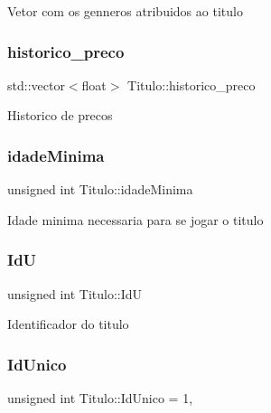 Vetor com os genneros atribuidos ao titulo \mbox{\label{classTitulo_aad5a44ca7e83939e8b47f1e11b80eca2}} 
\subsubsection{\texorpdfstring{historico\+\_\+preco}{historico\_preco}}
{\footnotesize\ttfamily std\+::vector$<$float$>$ Titulo\+::historico\+\_\+preco\hspace{0.3cm}{\ttfamily [protected]}}

Historico de precos \mbox{\label{classTitulo_a28891078f53fc3317de60ae739514955}} 
\subsubsection{\texorpdfstring{idade\+Minima}{idadeMinima}}
{\footnotesize\ttfamily unsigned int Titulo\+::idade\+Minima\hspace{0.3cm}{\ttfamily [protected]}}

Idade minima necessaria para se jogar o titulo \mbox{\label{classTitulo_aff7d1cc9accbc0f49c05cdc97c66844c}} 
\subsubsection{\texorpdfstring{IdU}{IdU}}
{\footnotesize\ttfamily unsigned int Titulo\+::\+IdU\hspace{0.3cm}{\ttfamily [protected]}}

Identificador do titulo \mbox{\label{classTitulo_a54ff099c5e3bfbf23d4326b4acc73263}} 
\subsubsection{\texorpdfstring{Id\+Unico}{IdUnico}}
{\footnotesize\ttfamily unsigned int Titulo\+::\+Id\+Unico = 1\hspace{0.3cm}{\ttfamily [static]}, {\ttfamily [protected]}}

